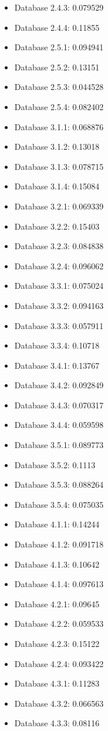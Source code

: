 \begin{itemize}
\item Database 2.4.3: 0.079529
\item Database 2.4.4: 0.11855
\item Database 2.5.1: 0.094941
\item Database 2.5.2: 0.13151
\item Database 2.5.3: 0.044528
\item Database 2.5.4: 0.082402
\item Database 3.1.1: 0.068876
\item Database 3.1.2: 0.13018
\item Database 3.1.3: 0.078715
\item Database 3.1.4: 0.15084
\item Database 3.2.1: 0.069339
\item Database 3.2.2: 0.15403
\item Database 3.2.3: 0.084838
\item Database 3.2.4: 0.096062
\item Database 3.3.1: 0.075024
\item Database 3.3.2: 0.094163
\item Database 3.3.3: 0.057911
\item Database 3.3.4: 0.10718
\item Database 3.4.1: 0.13767
\item Database 3.4.2: 0.092849
\item Database 3.4.3: 0.070317
\item Database 3.4.4: 0.059598
\item Database 3.5.1: 0.089773
\item Database 3.5.2: 0.1113
\item Database 3.5.3: 0.088264
\item Database 3.5.4: 0.075035
\item Database 4.1.1: 0.14244
\item Database 4.1.2: 0.091718
\item Database 4.1.3: 0.10642
\item Database 4.1.4: 0.097613
\item Database 4.2.1: 0.09645
\item Database 4.2.2: 0.059533
\item Database 4.2.3: 0.15122
\item Database 4.2.4: 0.093422
\item Database 4.3.1: 0.11283
\item Database 4.3.2: 0.066563
\item Database 4.3.3: 0.08116

\end{itemize}
